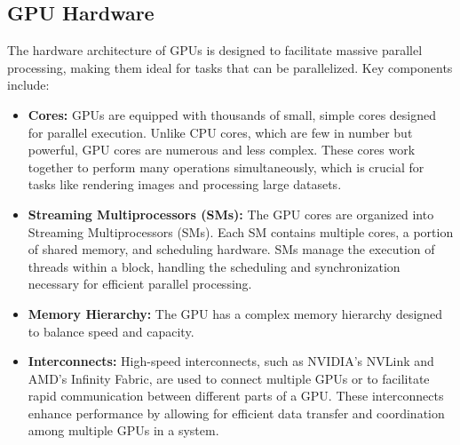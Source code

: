 \subsection{GPU Hardware}
    The hardware architecture of GPUs is designed to facilitate massive parallel processing, making them ideal for tasks that can be parallelized. Key components include:

\begin{itemize}
    \item \textbf{Cores:} GPUs are equipped with thousands of small, simple cores designed for parallel execution. Unlike CPU cores, which are few in number but powerful, GPU cores are numerous and less complex. These cores work together to perform many operations simultaneously, which is crucial for tasks like rendering images and processing large datasets.
    \item  \textbf{Streaming Multiprocessors (SMs):} The GPU cores are organized into Streaming Multiprocessors (SMs). Each SM contains multiple cores, a portion of shared memory, and scheduling hardware. SMs manage the execution of threads within a block, handling the scheduling and synchronization necessary for efficient parallel processing.
    \item \textbf{Memory Hierarchy:} The GPU has a complex memory hierarchy designed to balance speed and capacity.
    \item  \textbf{Interconnects:} High-speed interconnects, such as NVIDIA’s NVLink and AMD's Infinity Fabric, are used to connect multiple GPUs or to facilitate rapid communication between different parts of a GPU. These interconnects enhance performance by allowing for efficient data transfer and coordination among multiple GPUs in a system.
\end{itemize}

